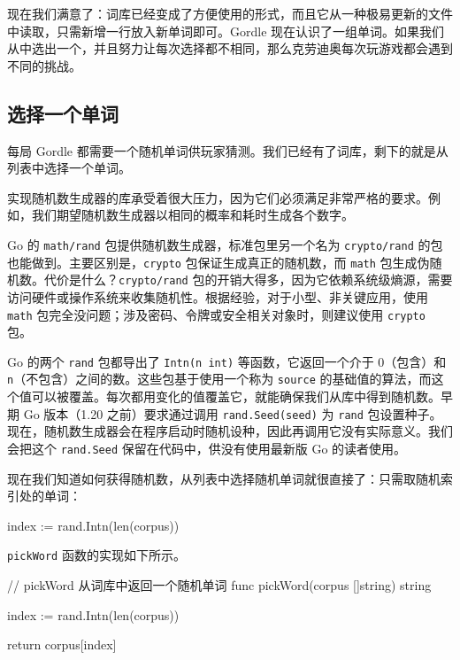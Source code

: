 现在我们满意了：词库已经变成了方便使用的形式，而且它从一种极易更新的文件中读取，只需新增一行放入新单词即可。Gordle 现在认识了一组单词。如果我们从中选出一个，并且努力让每次选择都不相同，那么克劳迪奥每次玩游戏都会遇到不同的挑战。

\subsection{选择一个单词}

每局 Gordle 都需要一个随机单词供玩家猜测。我们已经有了词库，剩下的就是从列表中选择一个单词。

实现随机数生成器的库承受着很大压力，因为它们必须满足非常严格的要求。例如，我们期望随机数生成器以相同的概率和耗时生成各个数字。

Go 的 \texttt{math/rand} 包提供随机数生成器，标准包里另一个名为 \texttt{crypto/rand} 的包也能做到。主要区别是，\texttt{crypto} 包保证生成真正的随机数，而 \texttt{math} 包生成伪随机数。代价是什么？\texttt{crypto/rand} 包的开销大得多，因为它依赖系统级熵源，需要访问硬件或操作系统来收集随机性。根据经验，对于小型、非关键应用，使用 \texttt{math} 包完全没问题；涉及密码、令牌或安全相关对象时，则建议使用 \texttt{crypto} 包。

Go 的两个 \texttt{rand} 包都导出了 \texttt{Intn(n int)} 等函数，它返回一个介于 0（包含）和 \texttt{n}（不包含）之间的数。这些包基于使用一个称为 \texttt{source} 的基础值的算法，而这个值可以被覆盖。每次都用变化的值覆盖它，就能确保我们从库中得到随机数。早期 Go 版本（1.20 之前）要求通过调用 \texttt{rand.Seed(seed)} 为 \texttt{rand} 包设置种子。现在，随机数生成器会在程序启动时随机设种，因此再调用它没有实际意义。我们会把这个 \texttt{rand.Seed} 保留在代码中，供没有使用最新版 Go 的读者使用。

现在我们知道如何获得随机数，从列表中选择随机单词就很直接了：只需取随机索引处的单词：

\begin{gocode}[]
index := rand.Intn(len(corpus))
\end{gocode}

\texttt{pickWord} 函数的实现如下所示。

\begin{gocode}[title={代码清单 5.35 corpus.go：\texttt{pickWord()} 方法}]
// pickWord 从词库中返回一个随机单词
func pickWord(corpus []string) string {
    index := rand.Intn(len(corpus))

    return corpus[index]
}
\end{gocode}

